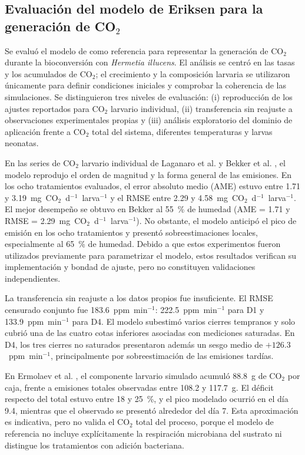 \subsection{Evaluación del modelo de Eriksen para la generación de \texorpdfstring{CO$_2$}{CO2}}
\label{sec:evaluacion_eriksen_co2}

Se evaluó el modelo de \cite{eriksenDynamicModellingFeed2022} como referencia para representar la generación de CO$_2$ durante la bioconversión con \textit{Hermetia illucens}. El análisis se centró en las tasas y los acumulados de CO$_2$; el crecimiento y la composición larvaria se utilizaron únicamente para definir condiciones iniciales y comprobar la coherencia de las simulaciones. Se distinguieron tres niveles de evaluación: (i) reproducción de los ajustes reportados para CO$_2$ larvario individual, (ii) transferencia sin reajuste a observaciones experimentales propias y (iii) análisis exploratorio del dominio de aplicación frente a CO$_2$ total del sistema, diferentes temperaturas y larvas neonatas.

En las series de CO$_2$ larvario individual de Laganaro et al. \cite{laganaroGrowthMetabolicPerformance2021a} y Bekker et al. \cite{bekkerImpactSubstrateMoisture2021a}, el modelo reprodujo el orden de magnitud y la forma general de las emisiones. En los ocho tratamientos evaluados, el error absoluto medio (AME) estuvo entre 1.71 y 3.19~mg~CO$_2$~d$^{-1}$~larva$^{-1}$ y el RMSE entre 2.29 y 4.58~mg~CO$_2$~d$^{-1}$~larva$^{-1}$. El mejor desempeño se obtuvo en Bekker al 55~\% de humedad (AME = 1.71 y RMSE = 2.29~mg~CO$_2$~d$^{-1}$~larva$^{-1}$). No obstante, el modelo anticipó el pico de emisión en los ocho tratamientos y presentó sobreestimaciones locales, especialmente al 65~\% de humedad. Debido a que estos experimentos fueron utilizados previamente para parametrizar el modelo, estos resultados verifican su implementación y bondad de ajuste, pero no constituyen validaciones independientes.

La transferencia sin reajuste a los datos propios fue insuficiente. El RMSE censurado conjunto fue 183.6~ppm~min$^{-1}$: 222.5~ppm~min$^{-1}$ para D1 y 133.9~ppm~min$^{-1}$ para D4. El modelo subestimó varios cierres tempranos y solo cubrió una de las cuatro cotas inferiores asociadas con mediciones saturadas. En D4, los tres cierres no saturados presentaron además un sesgo medio de $+126.3$~ppm~min$^{-1}$, principalmente por sobreestimación de las emisiones tardías.

En Ermolaev et al. \cite{ermolaevGreenhouseGasEmissions2019}, el componente larvario simulado acumuló 88.8~g de CO$_2$ por caja, frente a emisiones totales observadas entre 108.2 y 117.7~g. El déficit respecto del total estuvo entre 18 y 25~\%, y el pico modelado ocurrió en el día 9.4, mientras que el observado se presentó alrededor del día 7. Esta aproximación es indicativa, pero no valida el CO$_2$ total del proceso, porque el modelo de referencia no incluye explícitamente la respiración microbiana del sustrato ni distingue los tratamientos con adición bacteriana.

